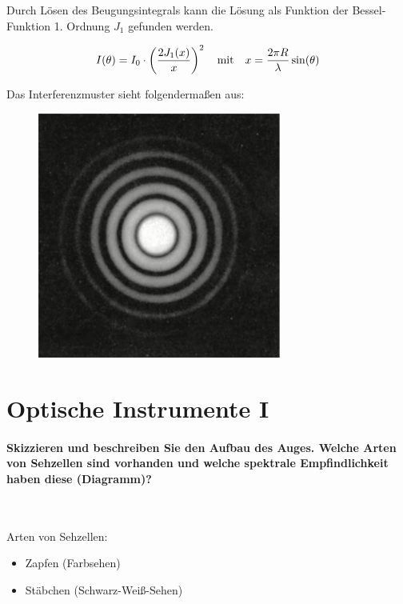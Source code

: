 \documentclass[a4paper, 11pt, ngerman, parskip=half-]{scrartcl}
\begin{document}
Durch Lösen des Beugungsintegrals kann die Lösung als Funktion der Bessel-Funktion 1. Ordnung $J_1$ gefunden werden.

\begin{equation}
    I(\theta) = I_0 \cdot \left( \frac{2 J_1(x)}{x} \right)^2 \qq{mit} x = \frac{2 \pi R}{\lambda} \sin(\theta)
\end{equation}

Das Interferenzmuster sieht folgendermaßen aus:
\begin{figure}[H]
    \centering
    \includegraphics[width=8cm]{image/19/6}
\end{figure}

\newpage

\section{Optische Instrumente I}

\paragraph{Skizzieren und beschreiben Sie den Aufbau des Auges. Welche Arten von Sehzellen sind
    vorhanden und welche spektrale Empfindlichkeit haben diese (Diagramm)?} ~

Arten von Sehzellen:
\begin{itemize}
    \item Zapfen (Farbsehen)
    \item Stäbchen (Schwarz-Weiß-Sehen)
\end{itemize}
\end{document}
